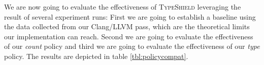 \begin{table*}[htbp!]
		\caption {The results of comparing our implementation results with the theoretical limits for the different restriction policies combined with an an address taken analysis for optimization level O2.}
		\label{tbl:policycompat}
\end{table*}

We are now going to evaluate the effectiveness of \textsc{TypeShield} leveraging the result of several experiment runs: First we are going to establish a baseline using the data 
collected from our Clang/LLVM pass, which are the theoretical limits our implementation can reach. Second we are going to evaluate the effectiveness of our \textit{count} 
policy and third we are going to evaluate the effectiveness of our \textit{type} policy. The results are depicted in table \ref{tbl:policycompat}.

